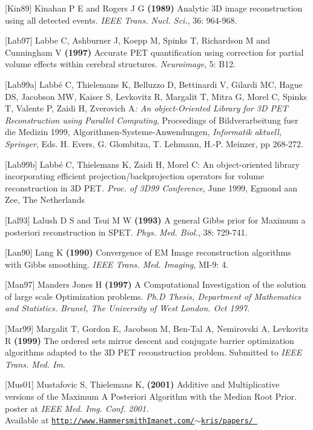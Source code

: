\documentclass{article}
\def\R2Lurl#1#2{\mbox{\href{#1}{\tt #2}}}
\begin{document}
{[}Kin89] Kinahan P E and Rogers J G \textbf{(1989)} Analytic 3D image 
reconstruction using all detected events. \textit{IEEE Trans. Nucl. 
Sci.}, 36: 964-968.


{[}Lab97] Labbe C, Ashburner J, Koepp M, Spinks T, Richardson M 
and Cunningham V \textbf{(1997)} Accurate PET quantification using 
correction for partial volume effects within cerebral structures. \textit{Neuroimage}, 
5: B12.


{[}Lab99a] Labb\'{e} C, Thielemans K, Belluzzo D, Bettinardi V, Gilardi 
MC, Hague DS, Jacobson MW, Kaiser S, Levkovitz R, Margalit T, 
Mitra G, Morel C, Spinks T, Valente P, Zaidi H, Zverovich A\textit{: 
An object-Oriented Library for 3D PET Reconstruction using Parallel 
Computing}, Proceedings of Bildverarbeitung fuer die Medizin 
1999, Algorithmen-Systeme-Anwendungen, \textit{Informatik} 
\textit{aktuell, Springer}, Eds. H. Evers, G. Glombitza, T. Lehmann, 
H.-P. Meinzer, pp 268-272. 


{[}Lab99b] Labb\'{e} C, Thielemans K, Zaidi H, Morel C: An object-oriented 
library incorporating efficient projection/backprojection operators 
for volume reconstruction in 3D PET\textit{. Proc. of 3D99 Conference}, 
June 1999, Egmond aan Zee, The Netherlands 


{[}Lal93] Lalush D S and Tsui M W \textbf{(1993)} A general Gibbs prior 
for Maximum a posteriori reconstruction in SPET. \textit{Phys. Med. 
Biol.}, 38: 729-741.

{[}Lan90] Lang K \textbf{(1990)} Convergence of EM Image reconstruction 
algorithms with Gibbs smoothing. \textit{IEEE Trans. Med. Imaging}, 
MI-9: 4.


{[}Man97] Manders Jones H \textbf{(1997)} A Computational Investigation 
of the solution of large scale Optimization problems. \textit{Ph.D 
Thesis, Department of Mathematics and Statistics. Brunel, The 
University of West London. Oct 1997}.


{[}Mar99] Margalit T, Gordon E, Jacobson M, Ben-Tal A, Nemirovski 
A, Levkovitz R \textbf{(1999)} The ordered sets mirror descent and 
conjugate barrier optimization algorithms adapted to the 3D PET 
reconstruction problem. Submitted to \textit{IEEE Trans. Med. Im}.

{[}Mus01] Mustafovic S, Thielemans K, \textbf{(2001)} Additive and Multiplicative 
versions of the Maximum A Posteriori Algorithm with the Median 
Root Prior. poster at \textit{IEEE Med. Img. Conf. 2001.} \\
Available 
at \R2Lurl{http://www.HammersmithImanet.com/\ensuremath{\sim}kris/papers/}{http://www.HammersmithImanet.com/\ensuremath{\sim}kris/papers/ } 
\end{document}
